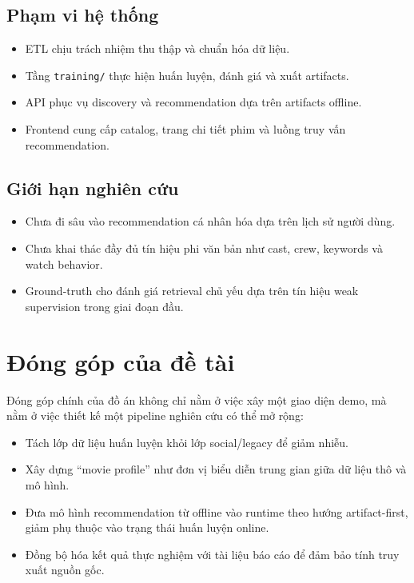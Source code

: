 \subsection{Phạm vi hệ thống}
\begin{itemize}
    \item ETL chịu trách nhiệm thu thập và chuẩn hóa dữ liệu.
    \item Tầng \texttt{training/} thực hiện huấn luyện, đánh giá và xuất artifacts.
    \item API phục vụ discovery và recommendation dựa trên artifacts offline.
    \item Frontend cung cấp catalog, trang chi tiết phim và luồng truy vấn recommendation.
\end{itemize}

\subsection{Giới hạn nghiên cứu}
\begin{itemize}
    \item Chưa đi sâu vào recommendation cá nhân hóa dựa trên lịch sử người dùng.
    \item Chưa khai thác đầy đủ tín hiệu phi văn bản như cast, crew, keywords và watch behavior.
    \item Ground-truth cho đánh giá retrieval chủ yếu dựa trên tín hiệu weak supervision trong giai đoạn đầu.
\end{itemize}

\section{Đóng góp của đề tài}
Đóng góp chính của đồ án không chỉ nằm ở việc xây một giao diện demo, mà nằm ở việc thiết kế một pipeline nghiên cứu có thể mở rộng:
\begin{itemize}
    \item Tách lớp dữ liệu huấn luyện khỏi lớp social/legacy để giảm nhiễu.
    \item Xây dựng ``movie profile'' như đơn vị biểu diễn trung gian giữa dữ liệu thô và mô hình.
    \item Đưa mô hình recommendation từ offline vào runtime theo hướng artifact-first, giảm phụ thuộc vào trạng thái huấn luyện online.
    \item Đồng bộ hóa kết quả thực nghiệm với tài liệu báo cáo để đảm bảo tính truy xuất nguồn gốc.
\end{itemize}


